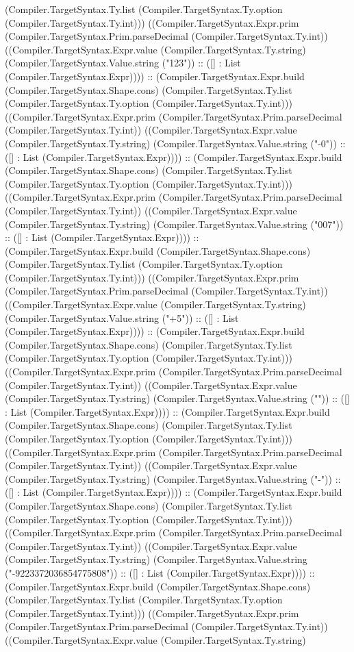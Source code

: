 \documentclass[11pt]{article}
\begin{document}
(Compiler.TargetSyntax.Ty.list (Compiler.TargetSyntax.Ty.option (Compiler.TargetSyntax.Ty.int))) ((Compiler.TargetSyntax.Expr.prim (Compiler.TargetSyntax.Prim.parseDecimal (Compiler.TargetSyntax.Ty.int)) ((Compiler.TargetSyntax.Expr.value (Compiler.TargetSyntax.Ty.string) (Compiler.TargetSyntax.Value.string ("123")) :: ([] : List (Compiler.TargetSyntax.Expr)))) :: (Compiler.TargetSyntax.Expr.build (Compiler.TargetSyntax.Shape.cons) (Compiler.TargetSyntax.Ty.list (Compiler.TargetSyntax.Ty.option (Compiler.TargetSyntax.Ty.int))) ((Compiler.TargetSyntax.Expr.prim (Compiler.TargetSyntax.Prim.parseDecimal (Compiler.TargetSyntax.Ty.int)) ((Compiler.TargetSyntax.Expr.value (Compiler.TargetSyntax.Ty.string) (Compiler.TargetSyntax.Value.string ("-0")) :: ([] : List (Compiler.TargetSyntax.Expr)))) :: (Compiler.TargetSyntax.Expr.build (Compiler.TargetSyntax.Shape.cons) (Compiler.TargetSyntax.Ty.list (Compiler.TargetSyntax.Ty.option (Compiler.TargetSyntax.Ty.int))) ((Compiler.TargetSyntax.Expr.prim (Compiler.TargetSyntax.Prim.parseDecimal (Compiler.TargetSyntax.Ty.int)) ((Compiler.TargetSyntax.Expr.value (Compiler.TargetSyntax.Ty.string) (Compiler.TargetSyntax.Value.string ("007")) :: ([] : List (Compiler.TargetSyntax.Expr)))) :: (Compiler.TargetSyntax.Expr.build (Compiler.TargetSyntax.Shape.cons) (Compiler.TargetSyntax.Ty.list (Compiler.TargetSyntax.Ty.option (Compiler.TargetSyntax.Ty.int))) ((Compiler.TargetSyntax.Expr.prim (Compiler.TargetSyntax.Prim.parseDecimal (Compiler.TargetSyntax.Ty.int)) ((Compiler.TargetSyntax.Expr.value (Compiler.TargetSyntax.Ty.string) (Compiler.TargetSyntax.Value.string ("+5")) :: ([] : List (Compiler.TargetSyntax.Expr)))) :: (Compiler.TargetSyntax.Expr.build (Compiler.TargetSyntax.Shape.cons) (Compiler.TargetSyntax.Ty.list (Compiler.TargetSyntax.Ty.option (Compiler.TargetSyntax.Ty.int))) ((Compiler.TargetSyntax.Expr.prim (Compiler.TargetSyntax.Prim.parseDecimal (Compiler.TargetSyntax.Ty.int)) ((Compiler.TargetSyntax.Expr.value (Compiler.TargetSyntax.Ty.string) (Compiler.TargetSyntax.Value.string ("")) :: ([] : List (Compiler.TargetSyntax.Expr)))) :: (Compiler.TargetSyntax.Expr.build (Compiler.TargetSyntax.Shape.cons) (Compiler.TargetSyntax.Ty.list (Compiler.TargetSyntax.Ty.option (Compiler.TargetSyntax.Ty.int))) ((Compiler.TargetSyntax.Expr.prim (Compiler.TargetSyntax.Prim.parseDecimal (Compiler.TargetSyntax.Ty.int)) ((Compiler.TargetSyntax.Expr.value (Compiler.TargetSyntax.Ty.string) (Compiler.TargetSyntax.Value.string ("-")) :: ([] : List (Compiler.TargetSyntax.Expr)))) :: (Compiler.TargetSyntax.Expr.build (Compiler.TargetSyntax.Shape.cons) (Compiler.TargetSyntax.Ty.list (Compiler.TargetSyntax.Ty.option (Compiler.TargetSyntax.Ty.int))) ((Compiler.TargetSyntax.Expr.prim (Compiler.TargetSyntax.Prim.parseDecimal (Compiler.TargetSyntax.Ty.int)) ((Compiler.TargetSyntax.Expr.value (Compiler.TargetSyntax.Ty.string) (Compiler.TargetSyntax.Value.string ("-9223372036854775808")) :: ([] : List (Compiler.TargetSyntax.Expr)))) :: (Compiler.TargetSyntax.Expr.build (Compiler.TargetSyntax.Shape.cons) (Compiler.TargetSyntax.Ty.list (Compiler.TargetSyntax.Ty.option (Compiler.TargetSyntax.Ty.int))) ((Compiler.TargetSyntax.Expr.prim (Compiler.TargetSyntax.Prim.parseDecimal (Compiler.TargetSyntax.Ty.int)) ((Compiler.TargetSyntax.Expr.value (Compiler.TargetSyntax.Ty.string) 
\end{document}
